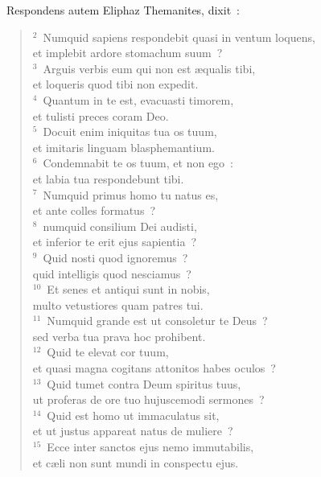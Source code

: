 ~\lettrine[lines=10,image=true,loversize=0.05,lraise=-0.03]{R}{}espondens autem Eliphaz Themanites, dixit~:
\begin{flushleft}\begin{verse}\vspace{6pt}${}^{2}$~Numquid sapiens respondebit quasi in ventum loquens,\\ et implebit ardore stomachum suum~?\\
${}^{3}$~Arguis verbis eum qui non est \ae qualis tibi,\\ et loqueris quod tibi non expedit.\\
${}^{4}$~Quantum in te est, evacuasti timorem,\\ et tulisti preces coram Deo.\\
${}^{5}$~Docuit enim iniquitas tua os tuum,\\ et imitaris linguam blasphemantium.\\
${}^{6}$~Condemnabit te os tuum, et non ego~:\\ et labia tua respondebunt tibi.\\
${}^{7}$~Numquid primus homo tu natus es,\\ et ante colles formatus~?\\
${}^{8}$~numquid consilium Dei audisti,\\ et inferior te erit ejus sapientia~?\\
${}^{9}$~Quid nosti quod ignoremus~?\\ quid intelligis quod nesciamus~?\\
${}^{10}$~Et senes et antiqui sunt in nobis,\\ multo vetustiores quam patres tui.\\
${}^{11}$~Numquid grande est ut consoletur te Deus~?\\ sed verba tua prava hoc prohibent.\\
${}^{12}$~Quid te elevat cor tuum,\\ et quasi magna cogitans attonitos habes oculos~?\\
${}^{13}$~Quid tumet contra Deum spiritus tuus,\\ ut proferas de ore tuo hujuscemodi sermones~?\\
${}^{14}$~Quid est homo ut immaculatus sit,\\ et ut justus appareat natus de muliere~?\\
${}^{15}$~Ecce inter sanctos ejus nemo immutabilis,\\ et c\ae li non sunt mundi in conspectu ejus.\\

\end{verse}
\end{flushleft}
